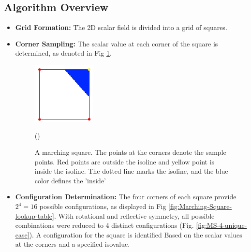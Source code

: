 \vspace{2mm}
\subsection{Algorithm Overview}

\begin{itemize}
\item \textbf{Grid Formation:} The 2D scalar field is divided into a grid of squares.

\item \textbf{Corner Sampling:} The scalar value at each corner of the square is determined, as denoted in Fig \ref{fig:Marching-Square-cell}.

\begin{figure}[H]
\centering
\includegraphics[height=0.3\textwidth,width=0.3\textwidth]{Figures/Marching-Sqaure-cell.png}
\decoRule
\caption{A marching square. The points at the corners denote the
sample points. Red points are outside the isoline and yellow point is inside the isoline. The dotted line marks the isoline, and the blue color defines the ’inside’} (\cite{Rassovsky_2014})
\label{fig:Marching-Square-cell}
\end{figure}

\item \textbf{Configuration Determination:} The four corners of each square provide \(2^4 = 16\) possible configurations, as displayed in Fig \ref{fig:Marching-Square-lookup-table}. With rotational and reflective symmetry, all possible combinations were reduced to 4 distinct configurations (Fig. \ref{fig:MS-4-unique-case}). A configuration for the square is identified Based on the scalar values at the corners and a specified isovalue.


\end{itemize}
